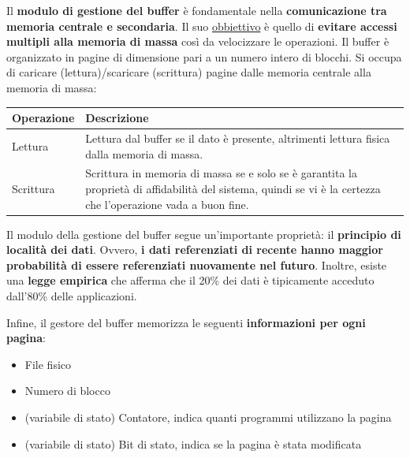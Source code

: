 \documentclass[a4paper]{article}
\begin{document}
\begin{enumerate}
		\noindent
		Il \textbf{modulo di gestione del buffer} è fondamentale nella \textbf{comunicazione tra memoria centrale e secondaria}. Il suo \underline{obbiettivo} è quello di \textbf{evitare accessi multipli alla memoria di massa} così da velocizzare le operazioni.\newline
		Il buffer è organizzato in pagine di dimensione pari a un numero intero di blocchi. Si occupa di caricare (lettura)/scaricare (scrittura) pagine dalle memoria centrale alla memoria di massa:
		\begin{table}[!htp]
			\centering
			\begin{tabular}{@{} l p{21em} @{}}
				\toprule
				Operazione & Descrizione \\
				\midrule
				Lettura		& Lettura dal buffer se il dato è presente, altrimenti lettura fisica dalla memoria di massa. \\ [0.5em]
				Scrittura	& Scrittura in memoria di massa se e solo se è garantita la proprietà di affidabilità del sistema, quindi se vi è la certezza che l'operazione vada a buon fine. \\
				\bottomrule
			\end{tabular}
		\end{table}
		
		\noindent
		Il modulo della gestione del buffer segue un'importante proprietà: il \textbf{principio di località dei dati}. Ovvero, \textbf{i dati referenziati di recente hanno maggior probabilità di essere referenziati nuovamente nel futuro}.\newline
		Inoltre, esiste una \textbf{legge empirica} che afferma che il 20\% dei dati è tipicamente acceduto dall'80\% delle applicazioni.
		
		Infine, il gestore del buffer memorizza le seguenti \textbf{informazioni per ogni pagina}:
		\begin{itemize}
			\item File fisico
			\item Numero di blocco
			\item (variabile di stato) Contatore, indica quanti programmi utilizzano la pagina
			\item (variabile di stato) Bit di stato, indica se la pagina è stata modificata
		\end{itemize}\newpage
		

\end{enumerate}
\end{document}

